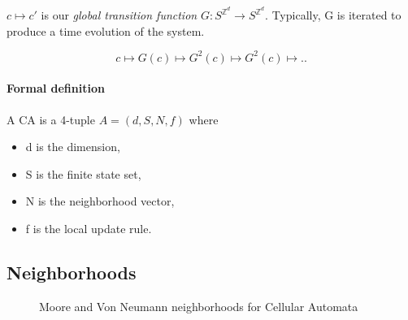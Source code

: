 $c \mapsto c' $ is our \textit{global transition function} $G: S^{\mathds{Z}^d} \longrightarrow S^{\mathds{Z}^d}$. Typically, G is iterated to produce a time evolution of the system.

$$ c \mapsto G(c) \mapsto G^2(c) \mapsto G^2(c) \mapsto..$$

\paragraph{Formal definition}

A CA is a 4-tuple $A=(d, S,N,f)$ where

\begin{itemize}
	\item d is the dimension,
	\item S is the finite state set,
	\item N is the neighborhood vector,
	\item f is the local update rule.
\end{itemize}

\subsection{Neighborhoods}

\begin{figure}
  \centering
  \hspace{1cm}%
  \caption{Moore and Von Neumann neighborhoods for Cellular Automata}
  \label{fig:2d_n}
\end{figure}

